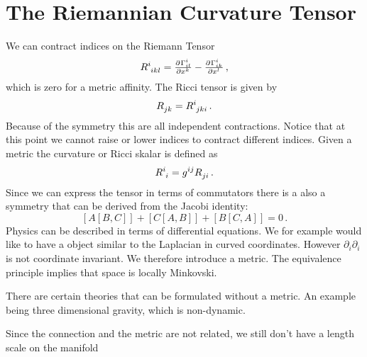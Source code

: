 \section{The Riemannian Curvature Tensor}
We can contract indices on the Riemann Tensor
\begin{equation}
\tensor{R}{^i_i_k_l}=\pd{{\Gamma^i_{il}}}{{x^k}}-\pd{{\Gamma^i_{ik}}}{{x^l}}\,,
\end{equation}
which is zero for a metric affinity. The Ricci tensor is given by
\begin{equation}
\tensor{R}{_j_k}=\tensor{R}{^i_j_k_i}\, .
\end{equation}
Because of the symmetry this are all independent
contractions.
Notice that at this point we cannot raise or lower indices to contract different indices.
Given a metric the curvature or Ricci skalar is defined as 
\begin{equation}
\tensor{R}{^i_i}=\tensor{g}{^i^j}\tensor{R}{_j_i}\, .
\end{equation}
Since we can express the  tensor in terms of commutators there is
a also a symmetry that can be derived from the Jacobi identity:
\begin{equation}
\left[A\left[B,C\right]\right]
+\left[C\left[A,B\right]\right]
+\left[B\left[C,A\right]\right]=0\,.
\end{equation}
Physics can be described in terms of differential equations. We for example
would like to have a object similar to the Laplacian in curved coordinates.
However $\partial_i\partial_i$ is not coordinate invariant. We therefore
introduce a metric. The equivalence principle implies that space is locally
Minkovski.
\begin{sidenote}
There are certain theories that can be formulated without a metric. An example
being three dimensional gravity, which is non-dynamic. 
\end{sidenote}
Since the connection and the metric are not related, we still don't have a length
scale on the manifold

